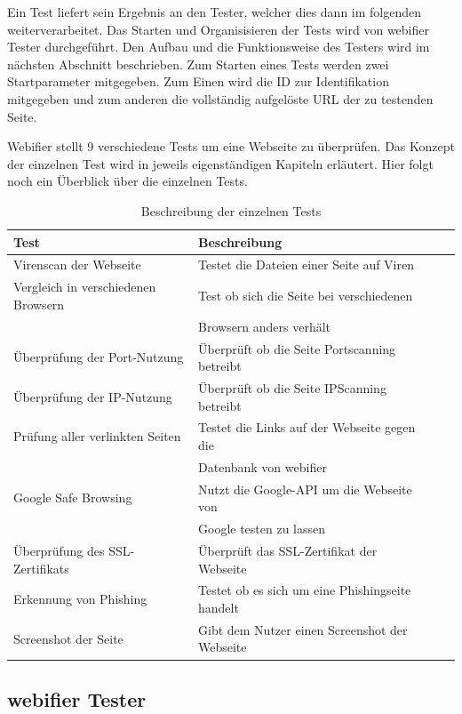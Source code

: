 Ein Test liefert sein Ergebnis an den Tester, welcher dies dann im folgenden weiterverarbeitet.
Das Starten und Organisisieren der Tests wird von webifier Tester durchgeführt. Den Aufbau und die Funktionsweise des Testers wird im nächsten Abschnitt beschrieben. Zum Starten eines Tests werden zwei Startparameter mitgegeben. Zum Einen wird die ID zur Identifikation mitgegeben und zum anderen die vollständig aufgelöste URL der zu testenden Seite.

Webifier stellt 9 verschiedene Tests um eine Webseite zu überprüfen. Das Konzept der einzelnen Test wird in jeweils eigenständigen Kapiteln erläutert. Hier folgt noch ein Überblick über die einzelnen Tests.

\begin{table}[H]
\centering
\begin{tabular}{|l|l|l|l|}
\hline
\textbf{Test} & \textbf{Beschreibung} \\\hline
Virenscan der Webseite & Testet die Dateien einer Seite auf Viren \\\hline
Vergleich in verschiedenen Browsern & Test ob sich die Seite bei verschiedenen \\ & Browsern anders verhält \\\hline
Überprüfung der Port-Nutzung & Überprüft ob die Seite Portscanning betreibt \\\hline
Überprüfung der IP-Nutzung & Überprüft ob die Seite IPScanning betreibt \\\hline
Prüfung aller verlinkten Seiten & Testet die Links auf der Webseite gegen die \\ & Datenbank von webifier \\\hline
Google Safe Browsing & Nutzt die Google-API um die Webseite von \\ & Google testen zu lassen \\\hline
Überprüfung des SSL-Zertifikats & Überprüft das SSL-Zertifikat der Webseite \\\hline
Erkennung von Phishing & Testet ob es sich um eine Phishingseite handelt \\\hline
Screenshot der Seite & Gibt dem Nutzer einen Screenshot der Webseite \\\hline
\end{tabular}
\caption{Beschreibung der einzelnen Tests}
\label{tbl:tests}
\end{table}

\subsection{webifier Tester}
\label{sec:konzept-tester}

